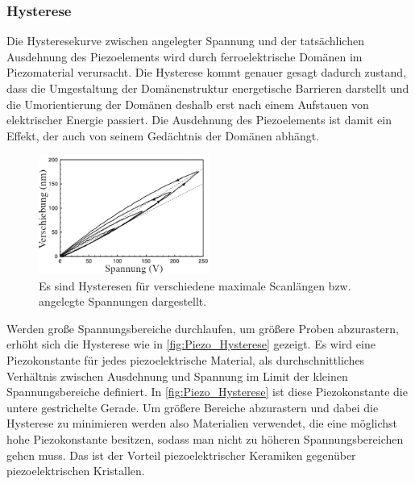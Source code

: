     \subsubsection*{Hysterese} \vspace*{-0.25cm}
        Die Hysteresekurve zwischen angelegter Spannung und der tatsächlichen Ausdehnung des Piezoelements wird durch ferroelektrische Domänen im Piezomaterial verursacht.
        Die Hysterese kommt genauer gesagt dadurch zustand, dass die Umgestaltung der Domänenstruktur energetische Barrieren darstellt und die Umorientierung der Domänen deshalb erst nach einem Aufstauen von elektrischer Energie passiert.
        Die Ausdehnung des Piezoelements ist damit ein Effekt, der auch von seinem Gedächtnis der Domänen abhängt.
        \begin{figure}[ht]
            \centering\captionsetup{format=plain}
            \includegraphics[width=0.5\textwidth]{bilder/Piezo_Hysterese.png}
            \caption{Es sind Hysteresen für verschiedene maximale Scanlängen bzw. angelegte Spannungen dargestellt. \cite{voigtlaender}}
            \label{fig:Piezo_Hysterese}
        \end{figure}
        Werden große Spannungsbereiche durchlaufen, um größere Proben abzurastern, erhöht sich die Hysterese wie in \autoref{fig:Piezo_Hysterese} gezeigt.
        Es wird eine Piezokonstante für jedes piezoelektrische Material, als durchschnittliches Verhältnis zwischen Ausdehnung und Spannung im Limit der kleinen Spannungsbereiche definiert.
        In \autoref{fig:Piezo_Hysterese} ist diese Piezokonstante die untere gestrichelte Gerade.
        Um größere Bereiche abzurastern und dabei die Hysterese zu minimieren werden also Materialien verwendet, die eine möglichst hohe Piezokonstante besitzen, sodass man nicht zu höheren Spannungsbereichen gehen muss.
        Das ist der Vorteil piezoelektrischer Keramiken gegenüber piezoelektrischen Kristallen.      

